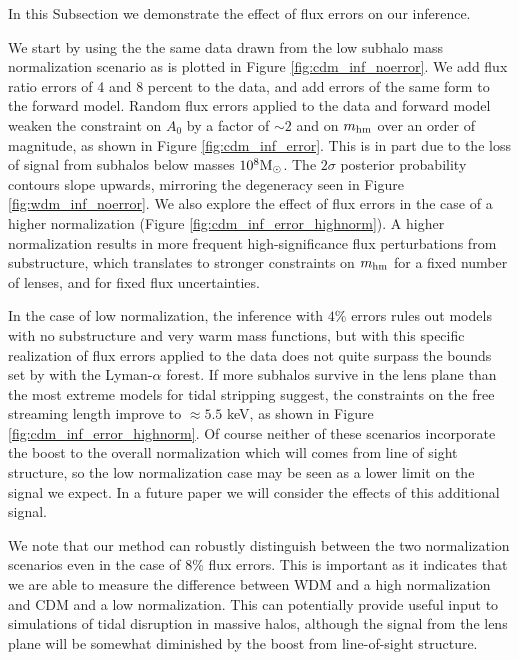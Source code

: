 In this Subsection we demonstrate the effect of flux errors on our inference.

We start by using the the same data drawn from the low subhalo mass normalization scenario as is plotted in Figure \ref{fig:cdm_inf_noerror}. We add flux ratio errors of 4 and 8 percent to the data, and add errors of the same form to the forward model. Random flux errors applied to the data and forward model weaken the constraint on $A_0$  by a factor of $\sim2$ and on $ m_{\rm{hm}}$ over an order of magnitude, as shown in Figure \ref{fig:cdm_inf_error}. This is in part due to the loss of signal from subhalos below masses $10^8 {\rm{M}_{\odot}}$. The $2\sigma$ posterior probability contours slope upwards, mirroring the degeneracy seen in Figure \ref{fig:wdm_inf_noerror}. We also explore the effect of flux errors in the case of a higher normalization (Figure \ref{fig:cdm_inf_error_highnorm}). A higher normalization results in more frequent high-significance flux perturbations from substructure, which translates to stronger constraints on $m_{\rm{hm}}$ for a fixed number of lenses, and for fixed flux uncertainties.

In the case of low normalization, the inference with $4\%$ errors rules out models with no substructure and very warm mass functions, but with this specific realization of flux errors applied to the data does not quite surpass the bounds set by \citet{Viel13} with the Lyman-$\alpha$ forest. If more subhalos survive in the lens plane than the most extreme models for tidal stripping suggest, the constraints on the free streaming length improve to $\approx 5.5$ keV, as shown in Figure \ref{fig:cdm_inf_error_highnorm}. Of course neither of these scenarios incorporate the boost to the overall normalization which will comes from line of sight structure, so the low normalization case may be seen as a lower limit on the signal we expect. In a future paper we will consider the effects of this additional signal.

We note that our method can robustly distinguish between the two normalization scenarios even in the case of 8\% flux errors. This is important as it indicates that we are able to measure the difference between WDM and a high normalization and CDM and a low normalization. This can potentially provide useful input to simulations of tidal disruption in massive halos, although the signal from the lens plane will be somewhat diminished by the boost from line-of-sight structure.

